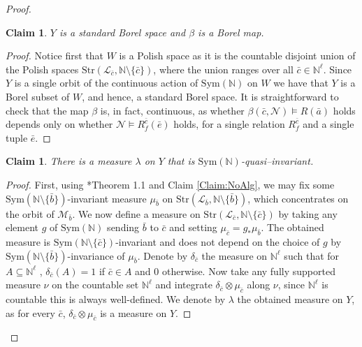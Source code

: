 \documentclass[11pt]{amsart}
\theoremstyle{plain}
\newtheorem{claim}[theorem]{Claim}
\theoremstyle{definition}
\newcommand{\N}{\mathbb{N}}
\begin{document}
\begin{proof}
\begin{claim}\label{Claim:Borel}
 $Y$ is a standard Borel space and  $\beta$ is a Borel map. \color{black}
\end{claim}
\begin{proof}
Notice first that $W$ is a Polish space as it is the countable disjoint union of the Polish spaces $\mathrm{Str}(\mathcal{L}_{\bar{c}},\N\setminus \{\bar{c}\})$, where the union ranges over all $\bar{c}\in \N^\ell$. Since $Y$ is a single orbit of the continuous action of $\mathrm{Sym}(\N)$ on $W$ we have that $Y$ is a Borel subset of $W$, and hence, a standard Borel space. It is straightforward to check that the map $\beta$ is, in fact, continuous, as whether ${\beta(\bar{c},\mathcal{N})}\models R(\bar{a})$ holds depends only on whether  ${\mathcal{N}}\models R^{\bar{c}}_{f}(\bar{e})$ holds, for a single relation  $R^{\bar{c}}_{f}$ and a single tuple $\bar{e}$.
\end{proof}



\begin{claim}
    There is a measure $\lambda$ on $Y$ that is $\mathrm{Sym}(\N)$-quasi--invariant.
\end{claim}


\begin{proof}
    First, using  \cite{AFP}*{Theorem 1.1} and Claim \ref{Claim:NoAlg}, we may fix some  $\mathrm{Sym}(\N\setminus \{\bar{b}\})$-invariant measure  $\mu_{\bar{b}}$ on $\mathrm{Str}(\mathcal{L}_{\bar b},\N \setminus \{\bar{b}\})$, which concentrates on the orbit of $\mathcal{M}_{\bar{b}}$. We now define a measure on $\mathrm{Str}(\mathcal{L}_{\bar{c}},\N \setminus \{\bar{c}\})$ by taking any element $g$ of $\mathrm{Sym}(\N)$ sending $\bar b$ to $\bar c$ and setting $\mu_{\bar{c}}=g_*\mu_{\bar b}$. The obtained measure is $\mathrm{Sym}(\N\setminus \{\bar{c}\})$-invariant and does not depend on the choice of $g$ by $\mathrm{Sym}(\N\setminus \{\bar{b}\} )$-invariance of $\mu_{\bar b}$. Denote by $\delta_{\bar c}$ the measure on $\N^\ell$ such that for $A\subseteq \N^\ell$ , $\delta_{\bar{c}}(A)=1$ if $\bar{c}\in A$  and $0$ otherwise. Now take any fully supported measure $\nu$ on the countable set $\N^\ell$ and integrate $\delta_{\bar c} \otimes \mu_{\bar c}$ along $\nu$, since $\N^{\ell}$ is countable this is always well-defined. We denote by $\lambda $ the obtained measure on $Y$, as for every $\bar c$, $\delta_{\bar c} \otimes \mu_{\bar c}$ is a measure on $Y$.



\end{proof}
\end{proof}
\end{document}

